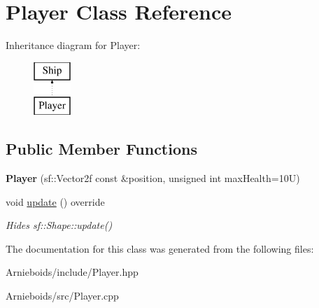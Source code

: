 \hypertarget{class_player}{}\section{Player Class Reference}
\label{class_player}
Inheritance diagram for Player\+:\begin{figure}[H]
\begin{center}
\leavevmode
\includegraphics[height=2.000000cm]{class_player}
\end{center}
\end{figure}
\subsection*{Public Member Functions}
\begin{DoxyCompactItemize}
\item 
\hypertarget{class_player_aac1c48b82a1e579cae0f93482f1c6a22}{}{\bfseries Player} (sf\+::\+Vector2f const \&position, unsigned int max\+Health=10\+U)\label{class_player_aac1c48b82a1e579cae0f93482f1c6a22}

\item 
\hypertarget{class_player_a6912bb6e48efb5845d59f0f4582827ef}{}void \hyperlink{class_player_a6912bb6e48efb5845d59f0f4582827ef}{update} () override\label{class_player_a6912bb6e48efb5845d59f0f4582827ef}

\begin{DoxyCompactList}\small\item\em Hides sf\+::\+Shape\+::update() \end{DoxyCompactList}\end{DoxyCompactItemize}


The documentation for this class was generated from the following files\+:\begin{DoxyCompactItemize}
\item 
Arnieboids/include/Player.\+hpp\item 
Arnieboids/src/Player.\+cpp\end{DoxyCompactItemize}
